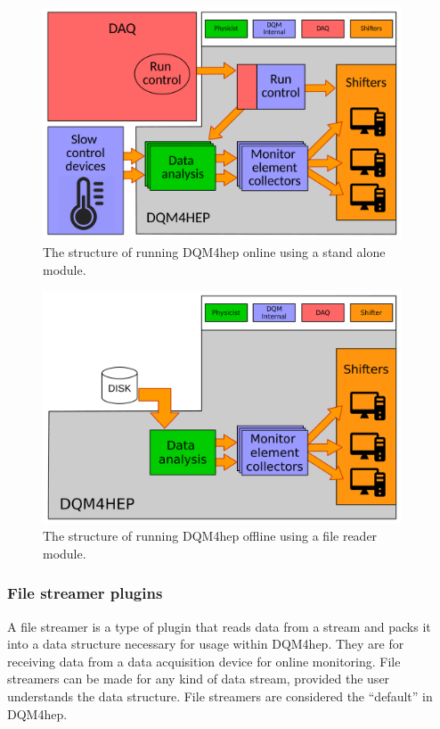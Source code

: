 \begin{figure}[p]
	\centering
	\includegraphics[width=0.95\textwidth]{../Pictures/StandaloneModuleArchitecture.pdf}
	\caption{The structure of running \acrshort{DQM4hep} online using a stand alone module.}
	\label{figure:daq/dqm4hep/standalone-module}
\end{figure}

\begin{figure}[p]
	\centering
	\includegraphics[width=0.95\textwidth]{../Pictures/FileReaderModuleArchitecture.pdf}
	\caption{The structure of running \acrshort{DQM4hep} offline using a file reader module.}
	\label{figure:daq/dqm4hep/file-reader}
\end{figure}

\subsubsection{File streamer plugins}
A file streamer is a type of plugin that reads data from a stream and packs it into a data structure necessary for usage within \acrshort{DQM4hep}. They are for receiving data from a data acquisition device for online monitoring. File streamers can be made for any kind of data stream, provided the user understands the data structure. File streamers are considered the ``default'' in \acrshort{DQM4hep}.

